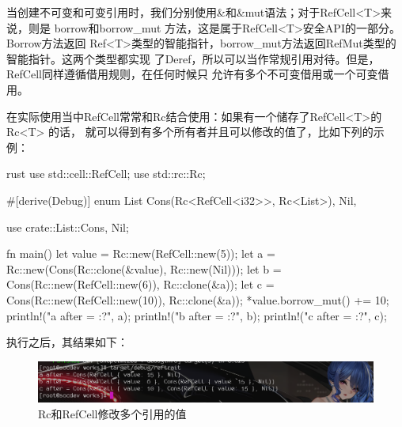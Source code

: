 当创建不可变和可变引用时，我们分别使用\&和\&mut语法；对于RefCell<T>来说，则是
borrow和borrow\_mut 方法，这是属于RefCell<T>安全API的一部分。Borrow方法返回
Ref<T>类型的智能指针，borrow\_mut方法返回RefMut类型的智能指针。这两个类型都实现
了Deref，所以可以当作常规引用对待。但是，RefCell同样遵循借用规则，在任何时候只
允许有多个不可变借用或一个可变借用。

在实际使用当中RefCell常常和Rc结合使用：如果有一个储存了RefCell<T>的 Rc<T> 的话，
就可以得到有多个所有者并且可以修改的值了，比如下列的示例：
\begin{code-block}{rust}
use std::cell::RefCell;
use std::rc::Rc;

#[derive(Debug)]
enum List {
    Cons(Rc<RefCell<i32>>, Rc<List>),
    Nil,
}

use crate::List::{Cons, Nil};

fn main() {
    let value = Rc::new(RefCell::new(5));
    let a = Rc::new(Cons(Rc::clone(&value), Rc::new(Nil)));
    let b = Cons(Rc::new(RefCell::new(6)), Rc::clone(&a));
    let c = Cons(Rc::new(RefCell::new(10)), Rc::clone(&a));
    *value.borrow_mut() += 10;
    println!("a after = {:?}", a);
    println!("b after = {:?}", b);
    println!("c after = {:?}", c);
}
\end{code-block}
执行之后，其结果如下：
\begin{figure}[H]
  \centering
  \includegraphics[width=\linewidth]{rust_ref_cell.png}
  \caption{Rc和RefCell修改多个引用的值}
  \label{fig:rust_ref_cell}
\end{figure}
